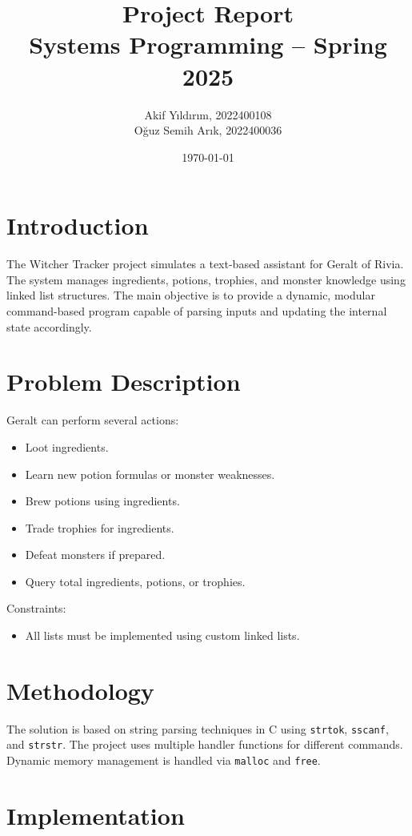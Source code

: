 \documentclass[a4paper,12pt]{article}
\title{Project Report  \\ \large Systems Programming – Spring 2025}
\author{Akif Yıldırım, 2022400108 \\ Oğuz Semih Arık, 2022400036 
}
\date{\today}
\begin{document}
\maketitle

\section{Introduction}
The Witcher Tracker project simulates a text-based assistant for Geralt of Rivia. The system manages ingredients, potions, trophies, and monster knowledge using linked list structures. The main objective is to provide a dynamic, modular command-based program capable of parsing inputs and updating the internal state accordingly.

\section{Problem Description}
Geralt can perform several actions:
\begin{itemize}
    \item Loot ingredients.
    \item Learn new potion formulas or monster weaknesses.
    \item Brew potions using ingredients.
    \item Trade trophies for ingredients.
    \item Defeat monsters if prepared.
    \item Query total ingredients, potions, or trophies.
\end{itemize}

Constraints:
\begin{itemize}
    
    \item All lists must be implemented using custom linked lists.
\end{itemize}

\section{Methodology}
The solution is based on string parsing techniques in C using \texttt{strtok}, \texttt{sscanf}, and \texttt{strstr}. The project uses multiple handler functions for different commands. Dynamic memory management is handled via \texttt{malloc} and \texttt{free}.





\section{Implementation}
\end{document}
